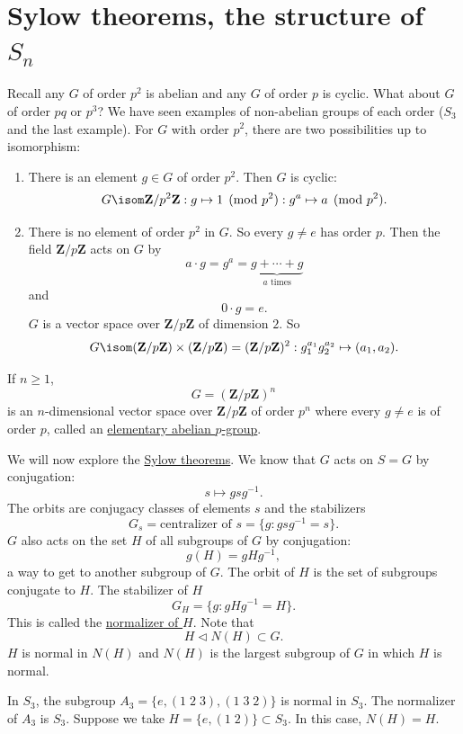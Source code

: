\documentclass[11pt, oneside]{amsart}
\numberwithin{equation}{section}
\numberwithin{theorem}{section}
\theoremstyle{definition}
\def\Z{\mathbf{Z}}
\begin{document}
{\section{Sylow theorems, the structure of $S_n$}
Recall any $G$ of order $p^2$ is abelian and any $G$ of order $p$ is cyclic. What about $G$ of order $pq$ or $p^3$? We have seen examples of non-abelian groups of each order ($S_3$ and the last example). For $G$ with order $p^2$, there are two possibilities up to isomorphism:
\begin{enumerate}[label=(\roman*)]
\item There is an element $g\in G$ of order $p^2$. Then $G$ is cyclic:
$$
G\isom \Z/p^2\Z : g \mapsto 1 \pmod{p^2} : g^a \mapsto a\pmod{p^2}.
$$
\item There is no element of order $p^2$ in $G$. So every $g\neq e$ has order $p$. Then the field $\Z/p\Z$ acts on $G$ by 
$$
a\cdot g = g^a = \underbrace{g+\cdots+ g}_{a \textrm{ times}}
$$
and
$$
0\cdot g = e.
$$
$G$ is a vector space over $\Z/p\Z$ of dimension $2$. So
$$
G \isom  (\Z/p\Z)\times (\Z/p\Z) =  (\Z/p\Z)^2 : g_1^{a_1}  g_2^{a_2} \mapsto (a_1,a_2).
$$
\end{enumerate}
If $n\geqslant 1$, 
$$
G = (\Z/p\Z)^n
$$
is an $n$-dimensional vector space over $\Z/p\Z$ of order $p^n$ where every $g\neq e$ is of order $p$, called an \underline{elementary abelian $p$-group}.

We will now explore the \underline{Sylow theorems}. We know that $G$ acts on $S=G$ by conjugation:
$$
s\mapsto gsg^{-1}.
$$
The orbits are conjugacy classes of elements $s$ and the stabilizers 
$$
G_s = \textrm{centralizer of } s = \{g:gsg^{-1}=s\}.
$$
$G$ also acts on the set $H$ of all subgroups of $G$ by conjugation:
$$
g(H) = gHg^{-1},
$$
a way to get to another subgroup of $G$. The orbit of $H$ is the set of subgroups conjugate to $H$. The stabilizer of $H$ 
$$
G_H = \{g:gHg^{-1} =H\}.
$$
This is called the \underline{normalizer of $H$}. Note that
$$
H\lhd N(H) \subset G.
$$
$H$ is normal in $N(H)$ and $N(H)$ is the largest subgroup of $G$ in which $H$ is normal. 

In $S_3$, the subgroup $A_3 = \{e,(1\;2\;3), (1\;3\;2)\}$ is normal in $S_3$. The normalizer of $A_3$ is $S_3$. Suppose we take $H = \{e, (1\;2)\}\subset S_3$. In this case, $N(H) = H$. 

}
\end{document}
